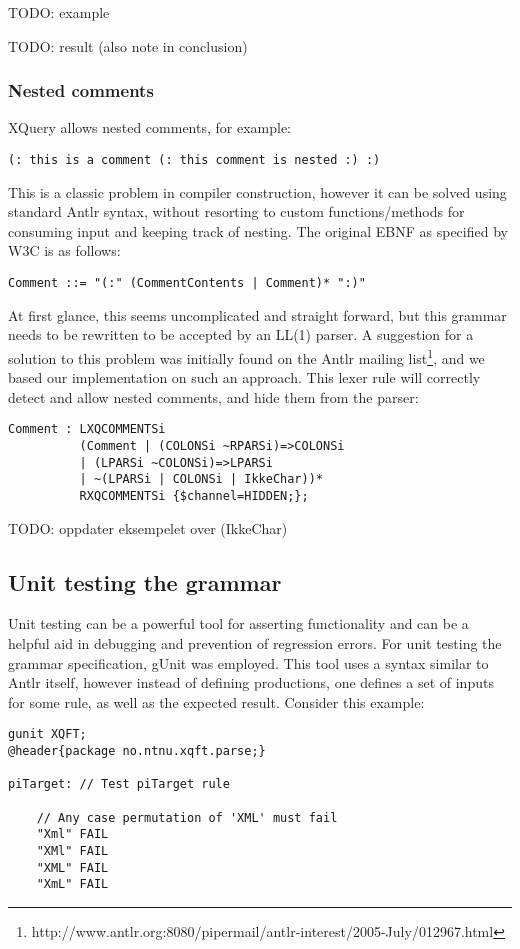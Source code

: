 TODO: example

TODO: result (also note in conclusion)

\subsubsection{Nested comments}
XQuery allows nested comments, for example:
\begin{verbatim}
(: this is a comment (: this comment is nested :) :)
\end{verbatim}
This is a classic problem in compiler construction, however it can be solved
using standard Antlr syntax, without resorting to custom functions/methods for
consuming input and keeping track of nesting. The original EBNF as specified by
W3C is as follows:
\begin{verbatim}
Comment ::= "(:" (CommentContents | Comment)* ":)"
\end{verbatim}
At first glance, this seems uncomplicated and straight forward, but this grammar
needs to be rewritten to be accepted by an LL(1) parser. A suggestion for a 
solution to this problem was initially found on the Antlr mailing
list\footnote{http://www.antlr.org:8080/pipermail/antlr-interest/2005-July/012967.html},
and we based our implementation on such an approach. This lexer rule will
correctly detect and allow nested comments, and hide them from the parser:
\begin{verbatim}	
Comment : LXQCOMMENTSi 
          (Comment | (COLONSi ~RPARSi)=>COLONSi 
          | (LPARSi ~COLONSi)=>LPARSi 
          | ~(LPARSi | COLONSi | IkkeChar))* 
          RXQCOMMENTSi {$channel=HIDDEN;};
\end{verbatim}
TODO: oppdater eksempelet over (IkkeChar)


\subsection{Unit testing the grammar}
Unit testing can be a powerful tool for asserting functionality and can be a
helpful aid in debugging and prevention of regression errors.  For unit testing the
grammar specification, gUnit \cite{gunit00} was employed. This tool uses a
syntax similar to Antlr itself, however instead of defining productions, one
defines a set of inputs for some rule, as well as the expected result. Consider
this example:

\begin{verbatim}
gunit XQFT;
@header{package no.ntnu.xqft.parse;}

piTarget: // Test piTarget rule

	// Any case permutation of 'XML' must fail
	"Xml" FAIL
	"XMl" FAIL
	"XML" FAIL
	"XmL" FAIL
\end{verbatim}

